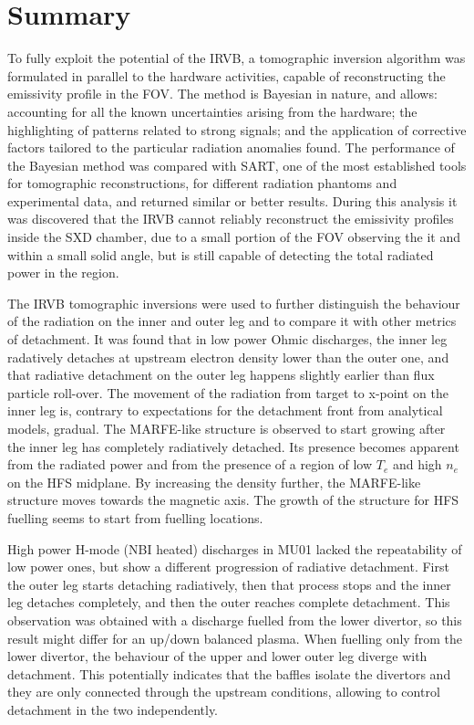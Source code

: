 \section{Summary}\label{Summary IRVB science}


To fully exploit the potential of the IRVB, a tomographic inversion algorithm was formulated in parallel to the hardware activities, capable of reconstructing the emissivity profile in the FOV. The method is Bayesian in nature, and allows: accounting for all the known uncertainties arising from the hardware; the highlighting of patterns related to strong signals; and the application of corrective factors tailored to the particular radiation anomalies found. The performance of the Bayesian method was compared with SART, one of the most established tools for tomographic reconstructions, for different radiation phantoms and experimental data, and returned similar or better results. During this analysis it was discovered that the IRVB cannot reliably reconstruct the emissivity profiles inside the SXD chamber, due to a small portion of the FOV observing the it and within a small solid angle, but is still capable of detecting the total radiated power in the region.

The IRVB tomographic inversions were used to further distinguish the behaviour of the radiation on the inner and outer leg and to compare it with other metrics of detachment. It was found that in low power Ohmic discharges, the inner leg radatively detaches at upstream electron density lower than the outer one, and that radiative detachment on the outer leg happens slightly earlier than flux particle roll-over. The movement of the radiation from target to x-point on the inner leg is, contrary to expectations for the detachment front from analytical models\cite{Lipschultz2016}, gradual. The MARFE-like structure is observed to start growing after the inner leg has completely radiatively detached. Its presence becomes apparent from the radiated power and from the presence of a region of low $T_e$ and high $n_e$ on the HFS midplane. By increasing the density further, the MARFE-like structure moves towards the magnetic axis. The growth of the structure for HFS fuelling seems to start from fuelling locations.

High power H-mode (NBI heated) discharges in MU01 lacked the repeatability of low power ones, but show a different progression of radiative detachment. First the outer leg starts detaching radiatively, then that process stops and the inner leg detaches completely, and then the outer reaches complete detachment. This observation was obtained with a discharge fuelled from the lower divertor, so this result might differ for an up/down balanced plasma. When fuelling only from the lower divertor, the behaviour of the upper and lower outer leg diverge with detachment. This potentially indicates that the baffles isolate the divertors and they are only connected through the upstream conditions, allowing to control detachment in the two independently.

